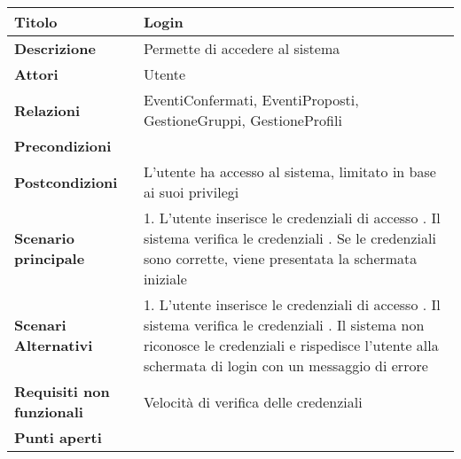 \begin{tabular} {|P{4.5cm}|P{12.5cm}|}
  \hline
  \textbf{Titolo}                   & Login                                                              \\
  \hline
  \textbf{Descrizione}              & Permette di accedere al sistema                                    \\
  \hline
  \textbf{Attori}                   & Utente                                                             \\
  \hline
  \textbf{Relazioni}                & EventiConfermati, EventiProposti, GestioneGruppi, GestioneProfili  \\
  \hline
  \textbf{Precondizioni}            &                                                                    \\
  \hline
  \textbf{Postcondizioni}           & L'utente ha accesso al sistema, limitato in base ai suoi privilegi \\
  \hline
  \textbf{Scenario principale}      & 1. L'utente inserisce le credenziali di
  accesso . Il sistema verifica le credenziali . Se le
  credenziali sono corrette, viene presentata la schermata iniziale                                      \\
  \hline
  \textbf{Scenari Alternativi}      & 1. L'utente inserisce le
  credenziali di accesso . Il sistema verifica le credenziali
  . Il sistema non riconosce le credenziali e rispedisce l'utente
  alla schermata di login con un messaggio di errore                                                     \\
  \hline
  \textbf{Requisiti non funzionali} & Velocità di verifica delle credenziali                             \\
  \hline
  \textbf{Punti aperti}             &                                                                    \\
  \hline
\end{tabular}
\hfill
\break

